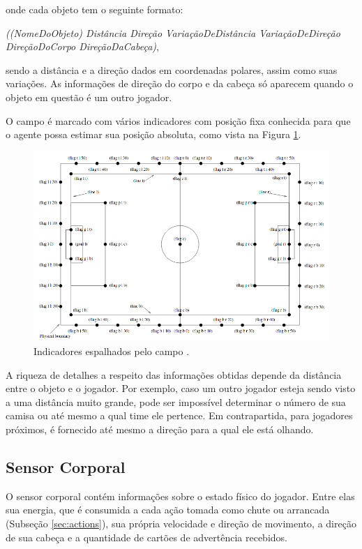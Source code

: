 \noindent onde cada objeto tem o seguinte formato:

\noindent \textit{((NomeDoObjeto) Distância Direção VariaçãoDeDistância VariaçãoDeDireção DireçãoDoCorpo DireçãoDaCabeça)},

\noindent sendo a distância e a direção dados em coordenadas polares, assim como suas variações. As informações de direção do corpo e da cabeça só aparecem quando o objeto em questão é um outro jogador.

O campo é marcado com vários indicadores com posição fixa conhecida para que o agente possa estimar sua posição absoluta, como vista na Figura \ref{fig:flags}.

\begin{figure}[H]
	\includegraphics[width=0.9\linewidth]{figs/flags.png}
	\centering
	\caption{Indicadores espalhados pelo campo  \cite{rcssmanual2003}.}
	\label{fig:flags}
\end{figure}

A riqueza de detalhes a respeito das informações obtidas depende da distância entre o objeto e o jogador. Por exemplo, caso um outro jogador esteja sendo visto a uma distância muito grande, pode ser impossível determinar o número de sua camisa ou até mesmo a qual time ele pertence. Em contrapartida, para jogadores próximos, é fornecido até mesmo a direção para a qual ele está olhando.

\subsection{Sensor Corporal}

O sensor corporal contém informações sobre o estado físico do jogador. Entre elas sua energia, que é consumida a cada ação tomada como chute ou arrancada (Subseção \ref{sec:actions}), sua própria velocidade e direção de movimento, a direção de sua cabeça e a quantidade de cartões de advertência recebidos.

